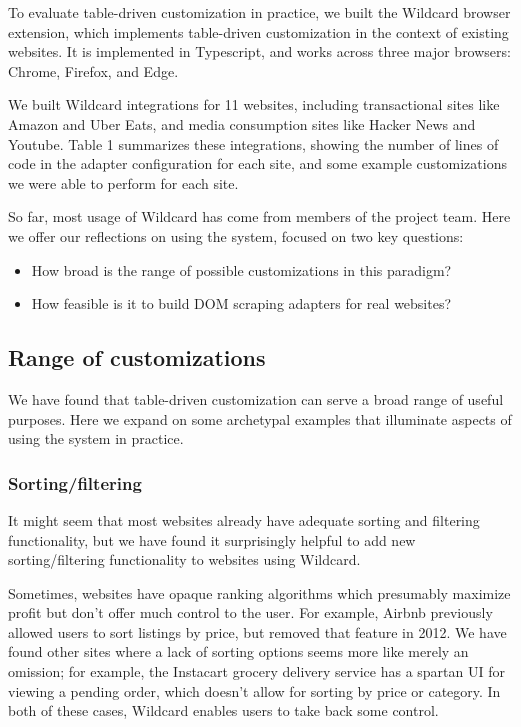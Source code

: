 \documentclass[sigplan,screen,10pt,anonymous,review]{acmart}
\providecommand{\tightlist}{%
  \setlength{\itemsep}{0pt}\setlength{\parskip}{0pt}}
\begin{document}
To evaluate table-driven customization in practice, we built the
Wildcard browser extension, which implements table-driven customization
in the context of existing websites. It is implemented in Typescript,
and works across three major browsers: Chrome, Firefox, and Edge.

We built Wildcard integrations for 11 websites, including transactional
sites like Amazon and Uber Eats, and media consumption sites like Hacker
News and Youtube. Table 1 summarizes these integrations, showing the
number of lines of code in the adapter configuration for each site, and
some example customizations we were able to perform for each site.

So far, most usage of Wildcard has come from members of the project
team. Here we offer our reflections on using the system, focused on two
key questions:

\begin{itemize}
\tightlist
\item
  How broad is the range of possible customizations in this paradigm?
\item
  How feasible is it to build DOM scraping adapters for real websites?
\end{itemize}

\hypertarget{range-of-customizations}{%
\subsection{Range of customizations}\label{range-of-customizations}}

We have found that table-driven customization can serve a broad range of
useful purposes. Here we expand on some archetypal examples that
illuminate aspects of using the system in practice.

\hypertarget{sortingfiltering}{%
\subsubsection{Sorting/filtering}\label{sortingfiltering}}

It might seem that most websites already have adequate sorting and
filtering functionality, but we have found it surprisingly helpful to
add new sorting/filtering functionality to websites using Wildcard.

Sometimes, websites have opaque ranking algorithms which presumably
maximize profit but don't offer much control to the user. For example,
Airbnb previously allowed users to sort listings by price, but removed
that feature in 2012. We have found other sites where a lack of sorting
options seems more like merely an omission; for example, the Instacart
grocery delivery service has a spartan UI for viewing a pending order,
which doesn't allow for sorting by price or category. In both of these
cases, Wildcard enables users to take back some control.
\end{document}
